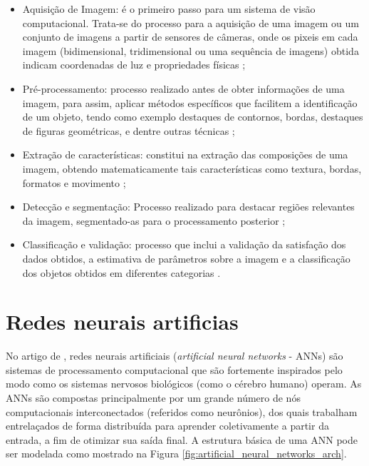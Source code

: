 \documentclass[
	12pt,				%
	oneside,			%
	a4paper,			%
	english,			%
	brazil				%
	]{abntex2ppgsi}
\begin{document}
\begin{itemize}
  \item Aquisição de Imagem: é o primeiro passo para um sistema de visão computacional. Trata-se do processo para a aquisição de uma imagem ou um conjunto de imagens a partir de sensores de câmeras, onde os pixeis em cada imagem (bidimensional, tridimensional ou uma sequência de imagens) obtida indicam coordenadas de luz e propriedades físicas \cite{de2014visao};
  
  \item Pré-processamento: processo realizado antes de obter informações de uma imagem, para assim, aplicar métodos específicos que facilitem a identificação de um objeto, tendo como exemplo destaques de contornos, bordas, destaques de figuras geométricas, e dentre outras técnicas \cite{de2014visao};
  
  \item Extração de características: constitui na extração das composições de uma imagem, obtendo matematicamente tais características como textura, bordas, formatos e movimento \cite{de2014visao};
  
  \item Detecção e segmentação: Processo realizado para destacar regiões relevantes da imagem, segmentado-as para o processamento posterior \cite{de2014visao};
  
  \item Classificação e validação: processo que inclui a validação da satisfação dos dados obtidos, a estimativa de parâmetros sobre a imagem e a classificação dos objetos obtidos em diferentes categorias \cite{de2014visao}.
\end{itemize}

\section{Redes neurais artificias}

No artigo de , redes neurais artificiais (\textit{artificial neural networks} - ANNs) são sistemas de processamento computacional que são fortemente inspirados pelo modo como os sistemas nervosos biológicos (como o cérebro humano) operam. As ANNs são compostas principalmente por um grande número de nós computacionais interconectados (referidos como neurônios), dos quais trabalham entrelaçados de forma distribuída para aprender coletivamente a partir da entrada, a fim de otimizar sua saída final. A estrutura básica de uma ANN pode ser modelada como mostrado na Figura \ref{fig:artificial_neural_networks_arch}. 
\end{document}
